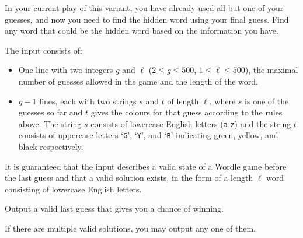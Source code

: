 In your current play of this variant, you have already used all but one of your
guesses, and now you need to find the hidden word using your final guess. Find
any word that could be the hidden word based on the information you have.

\begin{Input}
  The input consists of:
  \begin{itemize}
    \item One line with two integers $g$ and $\ell$ ($2\le g\le 500$,
      $1\le \ell\le 500$), the maximal number of guesses allowed in the game and the length of
      the word.
    \item $g-1$ lines, each with two strings $s$ and $t$ of length $\ell$, where
      $s$ is one of the guesses so far and $t$ gives the colours for that guess
      according to the rules above. The string $s$ consists of lowercase English letters
		  (\texttt{a}-\texttt{z}) and the string $t$ consists of uppercase letters
		  `\texttt{G}', `\texttt{Y}', and `\texttt{B}' indicating green, yellow, and
          black respectively.
  \end{itemize}
  It is guaranteed that the input describes a valid state of a Wordle game
  before the last guess and that a valid solution exists, in the form of a
	length $\ell$ word consisting of lowercase English letters.
\end{Input}

\begin{Output}
  Output a valid last guess that gives you a chance of winning.

  If there are multiple valid solutions, you may output any one of them.
\end{Output}
